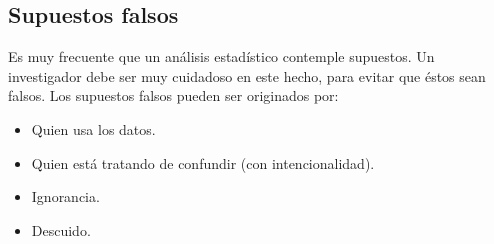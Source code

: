 \subsection{Supuestos falsos}

Es muy frecuente que un an\'alisis estad\'istico contemple supuestos. Un investigador debe ser muy cuidadoso en este hecho, para evitar que \'estos sean falsos. Los supuestos falsos pueden ser originados por:

\begin{itemize}
    \item Quien usa los datos.
    \item Quien est\'a tratando de confundir (con intencionalidad).
    \item Ignorancia.
    \item Descuido.
\end{itemize}
